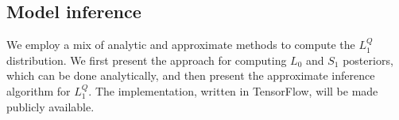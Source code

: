 \documentclass[9pt,twocolumn,twoside,lineno]{pnas-new}
\newcommand{\Listener}{L}
\newcommand{\QLONE}{\Listener_{{1}}^{{Q}}}
\begin{document}
{%


\subsection*{Model inference} \label{technicaloverview}


	We employ a mix of analytic and approximate methods to compute the $\QLONE$ distribution. We first present the approach for computing $L_0$ and $S_1$ posteriors, which can be done analytically, and then present the approximate inference algorithm for $\QLONE$.
	The implementation, written in TensorFlow, will be made publicly available.

}
\end{document}
